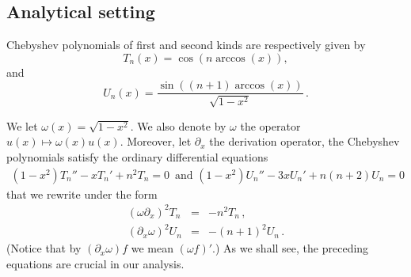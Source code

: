 \documentclass[a4paper]{article}
\begin{document}
	\subsection{Analytical setting}
	
	Chebyshev polynomials of first and second kinds are respectively given by 
	\[T_n(x) = \cos(n \arccos(x)),\]
	and 
	\[U_n(x) = \dfrac{\sin((n+1) \arccos(x))}{\sqrt{1 - x^2}}\,.\]
	
	We let $\omega(x) = \sqrt{1-x^2}$. We also denote by $\omega$ the operator $u(x) \mapsto \omega(x)u(x)$. Moreover, let $\partial_x$ the derivation operator, the Chebyshev polynomials satisfy
	the ordinary differential equations
	\begin{eqnarray*}
		(1-x^2)T_n'' -xT_n' +n^2T_n =0\,\mbox{ and }(1-x^2)U_n'' -3xU_n' +n(n+2)U_n =0
	\end{eqnarray*}
	that we rewrite under the form
	\begin{eqnarray}
	(\omega\partial_x)^2 T_n &=& -n^2T_n\,, \label{cheb1}\\
	(\partial_x\omega)^2 U_n &=& -(n+1)^2U_n\, .\label{cheb2}
	\end{eqnarray}
	(Notice that by $(\partial_x\omega) f$ we mean $(\omega f)'$.)
	As we shall see, the preceding equations are crucial in our analysis. 
	
\end{document}
